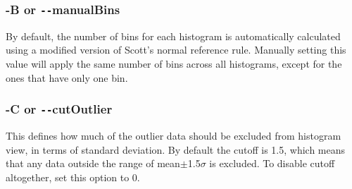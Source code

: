 \documentclass[letterpaper]{article}
\begin{document}
\subsubsection{\bf -B or \texttt{-{}-}manualBins}
By default, the number of bins for each histogram is automatically calculated using a modified version of Scott's normal reference rule. Manually setting this value will apply the same number of bins across all histograms, except for the ones that have only one bin.
\subsubsection{\bf -C or \texttt{-{}-}cutOutlier}
This defines how much of the outlier data should be excluded from histogram view, in terms of standard deviation. By default the cutoff is 1.5, which means that any data outside the range of mean$\pm$1.5$\sigma$ is excluded. To disable cutoff altogether, set this option to 0.
\end{document}
